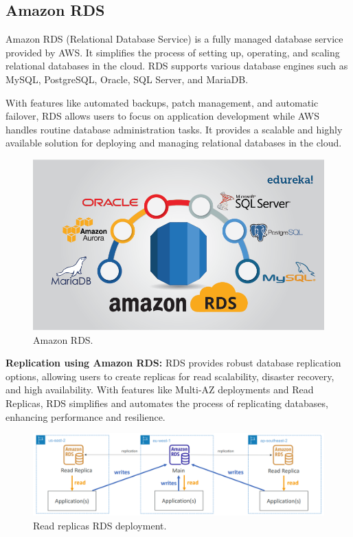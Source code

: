 \documentclass{article}
\begin{document}
\subsection{Amazon RDS}
Amazon RDS (Relational Database Service) is a fully managed database service provided by AWS. It simplifies the process of setting up, operating, and scaling relational databases in the cloud. RDS supports various database engines such as MySQL, PostgreSQL, Oracle, SQL Server, and MariaDB.\par
With features like automated backups, patch management, and automatic failover, RDS allows users to focus on application development while AWS handles routine database administration tasks. It provides a scalable and highly available solution for deploying and managing relational databases in the cloud.\par
\begin{figure}[h]
    \centering
    \includegraphics[width=12cm]{Pictures/Theory/AWS-RDS.png}
    \caption{Amazon RDS.}
    \label{fig:enter-label}
\end{figure}
\textbf{Replication using Amazon RDS: }RDS provides robust database replication options, allowing users to create replicas for read scalability, disaster recovery, and high availability. With features like Multi-AZ deployments and Read Replicas, RDS simplifies and automates the process of replicating databases, enhancing performance and resilience.\par
\begin{figure}[h]
    \centering
    \includegraphics[width=13cm]{Pictures/Theory/RDS Replicate.png}
    \caption{Read replicas RDS deployment.}
    \label{fig:enter-label}
\end{figure}
\newpage
\end{document}

